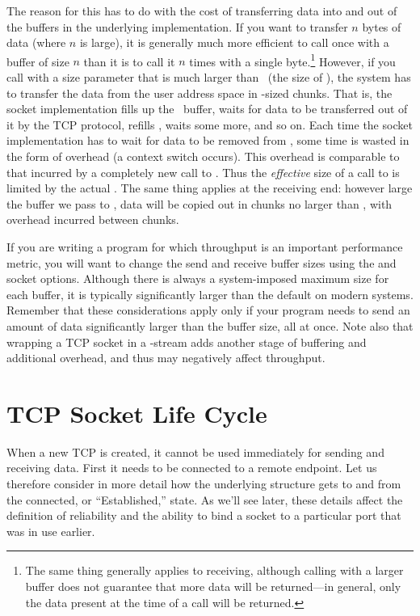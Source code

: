 The reason for this has to do with the cost of transferring data into
and out of the buffers in the underlying implementation.  If you want
to transfer $n$ bytes of data (where $n$ is large), it is generally
much more efficient to call  once
with a buffer of size $n$ than it is to call it $n$ times with a
single byte.\footnote{The same thing generally applies to receiving,
although calling  with a larger buffer does not
guarantee that more data will be returned---in general, only the
data present at the time of a call will be returned.}  However, if you call
 with a size parameter that is much
larger than \sqsize\ (the size of \sque),
the system has to transfer the data from the
user address space in \sqsize-sized chunks.  That is, the socket
implementation fills up the \sque\ buffer, waits for data to be
transferred out of it by the TCP protocol, refills \sque, waits
some more, and so on.  Each time the socket implementation has to wait
for data to be removed from \sque, some time is wasted in the
form of overhead (a context switch occurs). This overhead is
comparable to that incurred by a completely new call to
.  Thus the \emph{effective\/} size
of a call to  is limited by the actual \sqsize.
The same thing applies at the receiving end:
however large the buffer we pass to
, data will be copied out in chunks no
larger than \rqsize, with overhead incurred between chunks.

If you are writing a program for which throughput is an important
performance metric, you will want to change the send and receive
buffer sizes using the   and  socket
options.   Although there is
always a system-imposed maximum size for each buffer, it is typically
significantly larger than the default on modern systems.  Remember
that these considerations apply only if your program needs to send an
amount of data significantly larger than the buffer size, all at once.
Note also that wrapping a TCP socket in a -stream adds
another stage of buffering and additional overhead, and thus may
negatively affect throughput.

\section{TCP Socket Life Cycle}
\label{sect:lifecycle}%

When a new TCP  is created, it cannot be used immediately
for sending and receiving data.  First it needs to be connected to a
remote endpoint.
%
Let us therefore consider in more detail how the underlying structure
gets to and from the connected, or ``Established,'' state.  As we'll
see later, these details affect the definition of
reliability and the ability to bind a socket to a particular port that
was in use earlier.

